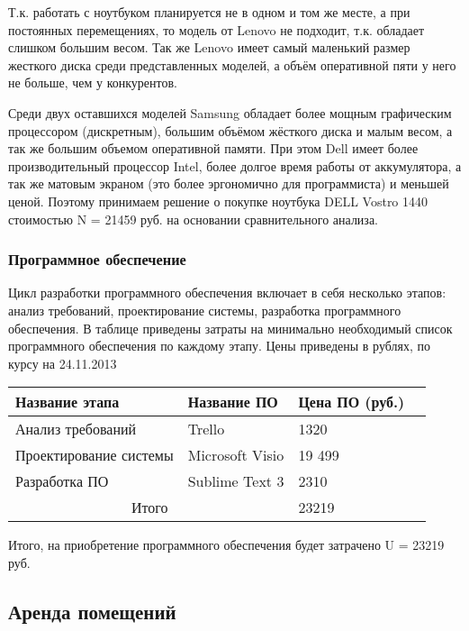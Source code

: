 Т.к. работать с ноутбуком планируется не в одном и том же месте, а при постоянных перемещениях, то модель от Lenovo не подходит, т.к. обладает слишком большим весом. Так же Lenovo имеет самый маленький размер жесткого диска среди представленных моделей, а объём оперативной пяти у него не больше, чем у конкурентов.

Среди двух оставшихся моделей Samsung обладает более мощным гра\-фическим процессором (дискретным), большим объёмом жёсткого диска и малым весом, а так же большим объемом оперативной памяти. При этом Dell имеет более производительный процессор Intel, более долгое время работы от аккумулятора, а так же матовым экраном (это более эргономично для программиста) и меньшей ценой. Поэтому принимаем решение о покупке ноутбука DELL Vostro 1440 стоимостью N = 21459 руб. на основании сравни\-тельного анализа.

\subsubsection{Программное обеспечение}

Цикл разработки программного обеспечения включает в себя несколько этапов: анализ требований, проектирование системы, разработка програм\-много обеспечения. В таблице приведены затраты на минимально необходи\-мый список программного обеспечения по каждому этапу. Цены приведены в рублях, по курсу на 24.11.2013

\begin{table}[H]
\begin{center}
\begin{tabular}{|p{3.5cm}|p{3.6cm}|p{3.6cm}|p{3.4cm}|}
\hline
Название этапа&
Название ПО&
Цена ПО (руб.)\\
\hline
Анализ требований&
Trello&
1320\\
\hline
Проектирование системы&
Microsoft Visio&
19 499\\
\hline
Разработка ПО&
Sublime Text 3&
2310\\
\hline
\multicolumn{2}{|c|}{Итого} &23219\\
\hline
\end{tabular}
\end{center}
\end{table}

Итого, на приобретение программного обеспечения будет затрачено U = 23219 руб.

\subsection{Аренда помещений}

